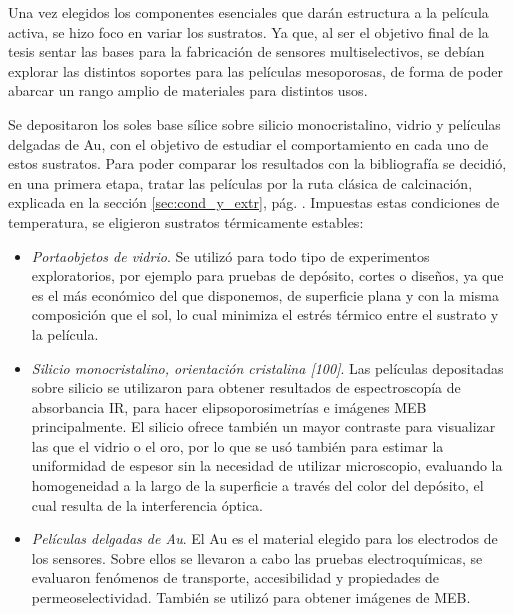 	Una vez elegidos los componentes esenciales que darán estructura a la película activa, se hizo foco en variar los sustratos. Ya que, al ser el objetivo final de la tesis sentar las bases para la fabricación de sensores multiselectivos, se debían explorar las distintos soportes para las películas mesoporosas, de forma de poder abarcar un rango amplio de materiales para distintos usos.

	Se depositaron los soles base sílice sobre silicio monocristalino, vidrio y películas delgadas de Au, con el objetivo de estudiar el comportamiento en cada uno de estos sustratos. Para poder comparar los resultados con la bibliografía\cite{Soler-Illia2006,Brinker1990} se decidió, en una primera etapa, tratar las películas por la ruta clásica de calcinación, explicada en la sección \ref{sec:cond_y_extr}, pág. \pageref{sec:cond_y_extr}. Impuestas estas condiciones de temperatura, se eligieron sustratos térmicamente estables:

		\begin{itemize}

			\item \textit{Portaobjetos de vidrio}. Se utilizó para todo tipo de experimentos exploratorios, por ejemplo para pruebas de depósito, cortes o diseños, ya que es el más económico del que disponemos, de superficie plana y con la misma composición que el sol, lo cual minimiza el estrés térmico entre el sustrato y la película.

			\item \textit{Silicio monocristalino, orientación cristalina [100]}. Las películas depositadas sobre silicio se utilizaron para obtener resultados de espectroscopía de absorbancia IR, para hacer elipsoporosimetrías e imágenes MEB principalmente. El silicio ofrece también un mayor contraste para visualizar las \pdm\space que el vidrio o el oro, por lo que se usó también para estimar la uniformidad de espesor sin la necesidad de utilizar microscopio, evaluando la homogeneidad a la largo de la superficie a través del color del depósito, el cual resulta de la interferencia óptica.
		
			\item \textit{Películas delgadas de Au}. El Au es el material elegido para los electrodos de los sensores. Sobre ellos se llevaron a cabo las pruebas electroquímicas, se evaluaron fenómenos de transporte, accesibilidad y propiedades de permeoselectividad. También se utilizó para obtener imágenes de MEB. 

			\end{itemize}
	
